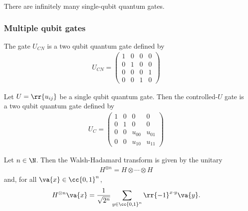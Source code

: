 \documentclass{article}
\begin{document}
\begin{theorem}
  \label{thm:infinite-gates}
  There are infinitely many single-qubit quantum gates.
\end{theorem}

\subsubsection{Multiple qubit gates}
\label{sec:multiple-qubit-gates}

\begin{definition}
  \label{def:cnot}
  The  gate $U_{CN}$ is a two qubit quantum gate defined by
  \begin{align*}
    U_{CN} = \begin{pmatrix}
      1 & 0 & 0 & 0 \\
      0 & 1 & 0 & 0 \\
      0 & 0 & 0 & 1 \\
      0 & 0 & 1 & 0
    \end{pmatrix}
  \end{align*}
\end{definition}

\begin{definition}
  \label{def:controlled-u}
  Let $U=\rr{u_{ij}}$ be a single qubit quantum gate. Then the controlled-$U$ gate is a two qubit
  quantum gate defined by
  \begin{align*}
    U_C = \begin{pmatrix}
      1 & 0 & 0 & 0 \\
      0 & 1 & 0 & 0 \\
      0 & 0 & u_{00} & u_{01} \\
      0 & 0 & u_{10} & u_{11}
    \end{pmatrix}
  \end{align*}
\end{definition}

\begin{definition}
  Let $n\in\N$. Then the Walsh-Hadamard transform is given by the unitary
  \begin{align*}
    H^{\otimes n} = H\otimes \cdots \otimes H
  \end{align*}
  and, for all $\va{x}\in\cc{0,1}^n$,
  \begin{align*}
    H^{\otimes n} \va{x} = \frac{1}{\sqrt{2^n}} \sum_{y\in\cc{0,1}^n} \rr{-1}^{x\cdot y}\va{y}.
  \end{align*}
\end{definition}
\end{document}

